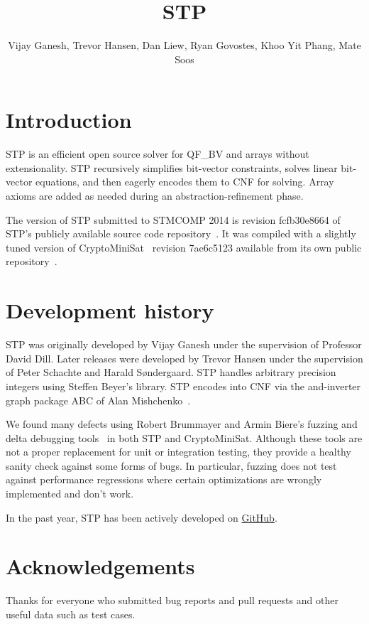 \documentclass{llncs}
\begin{document}
\title{STP}
\author{Vijay Ganesh, Trevor Hansen, Dan Liew, Ryan Govostes, Khoo Yit Phang, Mate Soos}
\institute{}

\maketitle
\thispagestyle{empty}
\pagestyle{empty}

\section{Introduction}
STP\cite{Vijay:Thesis:2007} is an efficient open source solver for QF\_BV and arrays without extensionality. STP
recursively simplifies bit-vector constraints, solves linear bit-vector equations, and then eagerly encodes them to CNF
for solving. Array axioms are added as needed during an abstraction-refinement phase.

The version of STP submitted to STMCOMP 2014 is revision fcfb30e8664 of STP's publicly available source code
repository~\cite{STP:github}. It was compiled with a slightly tuned version of
CryptoMiniSat~\cite{DBLP:conf/sat/SoosNC09} revision 7ae6c5123 available from its own public
repository~\cite{CMS:github}.


\section{Development history}
STP was originally developed by Vijay Ganesh under the supervision of Professor David Dill. Later releases were
developed by Trevor Hansen under the supervision of Peter Schachte and Harald Søndergaard. STP handles arbitrary
precision integers using Steffen Beyer's library. STP encodes into CNF via the and-inverter graph package ABC of Alan
Mishchenko~\cite{Brayton:2010:AAI:2144310.2144317}.

We found many defects using Robert Brummayer and Armin Biere's
fuzzing and delta debugging tools~\cite{Brummayer:2009:FDS:1670412.1670413} in both STP and CryptoMiniSat. Although
these tools are not a proper replacement for unit or integration testing, they provide a healthy sanity check against
some forms of bugs. In particular, fuzzing does not test against performance regressions where certain optimizations
are wrongly implemented and don't work.

In the past year, STP has been actively developed on \href{https://github.com/stp/stp}{GitHub}.

\section*{Acknowledgements}
Thanks for everyone who submitted bug reports and pull requests and other useful data such as test cases.




\vfill
\pagebreak
\end{document}
